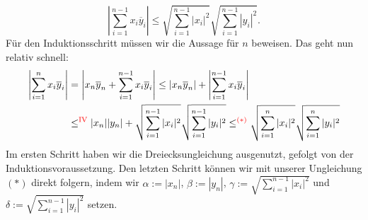 \begin{beweis}
\begin{equation}
\left| \sum_{i=1}^{n-1} x_i \overline{y}_i\right| \leq \sqrt{\sum_{i=1}^{n-1} |x_i|^2} \sqrt{\sum_{i=1}^{n-1} |y_i|^2}.
\end{equation}
Für den Induktionsschritt müssen wir die Aussage für $n$ beweisen. Das geht nun relativ schnell:
\begin{align*}
\left| \sum_{i=1}^n x_i \overline{y}_i\right| &= \left| x_n \overline{y}_n + \sum_{i=1}^{n-1} x_i \overline{y}_i\right|\leq |x_n \overline{y}_n| + \left| \sum_{i=1}^{n-1} x_i \overline{y}_i\right|\\
&\leq^\text{\textcolor{red}{IV}} |x_n| |y_n| + \sqrt{\sum_{i=1}^{n-1} |x_i|^2} \sqrt{\sum_{i=1}^{n-1} |y_i|^2} \leq^{\textcolor{red}{(\ast)}} \sqrt{\sum_{i=1}^{n} |x_i|^2} \sqrt{\sum_{i=1}^{n} |y_i|^2}
\end{align*}
Im ersten Schritt haben wir die Dreiecksungleichung ausgenutzt, gefolgt von der Induktionsvoraussetzung. Den letzten Schritt können wir mit unserer Ungleichung $(\ast)$ direkt folgern, indem wir $\alpha:=|x_n|$, $\beta:= |y_n|$, $\gamma:= \sqrt{\sum_{i=1}^{n-1} |x_i|^2}$ und $\delta :=\sqrt{\sum_{i=1}^{n-1} |y_i|^2}$ setzen.
\end{beweis}

